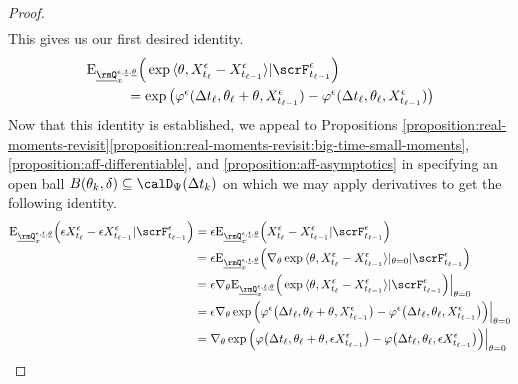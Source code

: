 \begin{proof}
\begin{align*}
  \end{align*}
  This gives us our first desired identity.
  \begin{equation*}
    \begin{aligned}[t]
      &\Exp_{\fddPrb^{\epsilon, \underline t, \underline\twistVar}_\stateVar}\Big( \exp\prj{\twistVar}{\Xee_{t_\ell}-\Xee_{t_{\ell-1}}} | \scrF^\epsilon_{t_{\ell-1}} \Big) \\
      &\hspace{1cm} = \exp\big(\affShift^\epsilon(\Delta t_\ell, \twistVar_\ell + \twistVar, \Xee_{t_{\ell-1}})-\affShift^\epsilon(\Delta t_\ell, \twistVar_\ell, \Xee_{t_{\ell-1}})\big)
    \end{aligned}
  \end{equation*}
  Now that this identity is established, we appeal to Propositions \ref{proposition:real-moments-revisit}\ref{proposition:real-moments-revisit:big-time-small-moments}, \ref{proposition:aff-differentiable}, and \ref{proposition:aff-asymptotics} in specifying an open ball $\ball{\twistVar_k}{\delta} \subseteq \momentSpace(\Delta t_k)$ on which we may apply derivatives to get the following identity.
  \begin{align*}
     \Exp_{\fddPrb^{\epsilon, \underline t,\underline\twistVar}_\stateVar} \Big( \Xe_{t_\ell} - \Xe_{t_{\ell-1}} | \scrF^\epsilon_{t_{\ell-1}} \Big) 
    &= \epsilon \Exp_{\fddPrb^{\epsilon, \underline t,\underline\twistVar}_\stateVar} \Big( \Xee_{t_\ell} - \Xee_{t_{\ell-1}} | \scrF^\epsilon_{t_{\ell-1}} \Big)  \\
    &= \epsilon \Exp_{\fddPrb^{\epsilon, \underline t,\underline\twistVar}_\stateVar} \Big( \nabla_{\twistVar} \exp\prj{\twistVar}{\Xee_{t_\ell} - \Xee_{t_{\ell-1}}}|_{\twistVar=0} | \scrF^\epsilon_{t_{\ell-1}} \Big) \\
    &=\epsilon \nabla_{\twistVar} \Exp_{\fddPrb^{\epsilon, \underline t,\underline\twistVar}_\stateVar} \Big( \exp\prj{\twistVar}{\Xee_{t_\ell} - \Xee_{t_{\ell-1}}} | \scrF^\epsilon_{t_{\ell-1}} \Big) \Big|_{\twistVar=0}\\
    &= \epsilon \nabla_{\twistVar} \exp\Big(\affShift^\epsilon\big(\Delta t_\ell, \twistVar_\ell + \twistVar, \Xee_{t_{\ell-1}}\big)-\affShift^\epsilon\big(\Delta t_\ell, \twistVar_\ell, \Xee_{t_{\ell-1}}\big)\Big) \Big|_{\twistVar=0} \\
    &= \nabla_{\twistVar} \exp\Big(\affShift\big(\Delta t_\ell, \twistVar_\ell + \twistVar, \Xe_{t_{\ell-1}}\big)-\affShift\big(\Delta t_\ell, \twistVar_\ell, \Xe_{t_{\ell-1}}\big)\Big) \Big|_{\twistVar=0} \\

\end{align*}
\end{proof}
